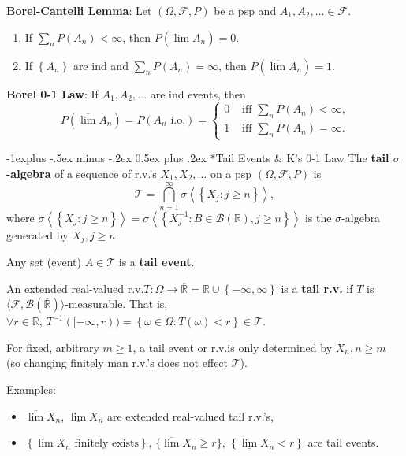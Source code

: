 \documentclass[paper=letter,fontsize=3mm]{scrartcl}
\makeatletter
\newcommand{\Borel}{\mathcal{B}}
\newcommand{\R}{\mathbb{R}}
\newcommand\set[1]{\left\{ #1 \right\}}
\renewcommand{\subsection}{\@startsection{subsection}{2}{0mm}%
                                {-1explus -.5ex minus -.2ex}%
                                {0.5ex plus .2ex}%
                                {\normalfont\normalsize\bfseries}}
\makeatother
\begin{document}
\begin{multicols*}{3}
\textbf{Borel-Cantelli Lemma}: Let $(\Omega, \mathcal{F}, P)$ be a psp and $A_1, A_2, \dots \in \mathcal{F}$. 
\begin{enumerate}
\item If $\sum_{n} P(A_n) < \infty$, then $P\left( \overline{\lim} A_n\right) = 0$.
\item If $\set{A_n}$ are ind and $\sum_{n} P(A_n) = \infty$, then $P\left( \overline{\lim} A_n\right) = 1$.
\end{enumerate}

\textbf{Borel 0-1 Law}: If $A_1, A_2, \dots$ are ind events, then
$$P(\overline{\lim} A_n) = P(A_n \text{ i.o.}) = 
\left\{ \begin{array}{ll}
 0 &\mbox{ iff $\sum_{n} P(A_n) < \infty$,} \\
 1 &\mbox{ iff $\sum_{n} P(A_n) = \infty$.}
       \end{array} \right.
$$

\subsection*{Tail Events \& K's 0-1 Law}
The \textbf{tail $\sigma$-algebra} of a sequence of r.v.\@'s $X_1, X_2, \dots$ on a psp $(\Omega, \mathcal{F}, P)$ is
$$\mathcal{T} = \bigcap_{n=1}^\infty \sigma \left\langle \set{X_j: j \ge n} \right\rangle,$$
where $ \sigma \left\langle \set{X_j: j \ge n} \right\rangle =  \sigma \left\langle \set{X_j^{-1}:B \in \Borel(\R),  j \ge n} \right\rangle$ is the $\sigma$-algebra generated by $X_j, j \ge n$. \\\medskip

Any set (event) $A \in \mathcal{T}$ is a \textbf{tail event}. \\\medskip

An extended real-valued r.v.\@ $T: \Omega \to \overline{\R} = \R \cup \set{-\infty, \infty}$ is a \textbf{tail r.v.\@} if $T$ is $\langle \mathcal{F}, \Borel(\overline{\R})\rangle$-measurable. That is, $\forall r \in \R, ~ T^{-1}([-\infty, r)) = \set{\omega \in \Omega: T(\omega) < r} \in \mathcal{T}$. \\\medskip

For fixed, arbitrary $m \ge 1$, a tail event or r.v.\@ is only determined by $X_n,  n \ge m$ (so changing finitely man r.v.\@'s does not effect $\mathcal{T}$). \\\medskip

Examples: 
\begin{itemize}
\item $\overline{\lim} X_n$, $\underline{\lim}X_n$ are extended real-valued tail r.v.\@'s,
\item $\set{\lim X_n \text{ finitely exists}}$, $\{\overline{\lim} X_n \ge r\}$, $\set{\underline{\lim} X_n < r}$ are tail events. 
\end{itemize}


\end{multicols*}
\end{document}
